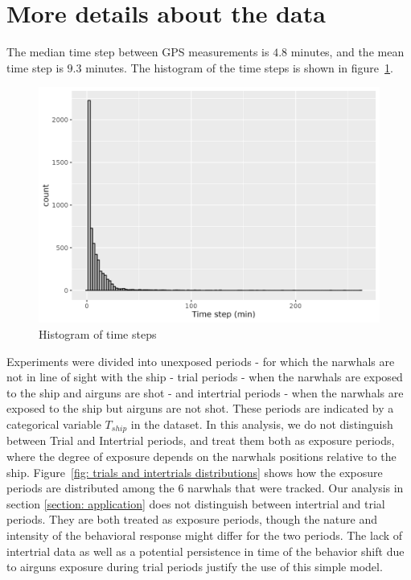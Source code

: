 \documentclass[11pt]{article}
\newcommand {\1}{\mathbb{1}}
\theoremstyle{definition}
\theoremstyle{remark}
\theoremstyle{remark}
\begin{document}
\printbibliography

\newpage 

\appendix

\section{More details about the data}

The median time step between GPS measurements is $4.8$ minutes, and the mean time step is $9.3$ minutes. The histogram of the time steps is shown in figure~\ref{fig:alltimestepshisto}.

\begin{figure}[H]
	\centering
	\includegraphics[scale=0.4]{images/data_exploration/all_time_steps_histo}
	\caption{Histogram of time steps}
	\label{fig:alltimestepshisto}
\end{figure}



Experiments were divided into unexposed periods - for which the narwhals are not in line of sight with the ship - trial periods - when the narwhals are exposed to the ship and airguns are shot - and intertrial periods - when the narwhals are exposed to the ship but airguns are not shot. These periods are indicated by a categorical variable $T_{ship}$ in the dataset. In this analysis, we do not distinguish between Trial and Intertrial periods, and treat them both as exposure periods, where the degree of exposure depends on the narwhals positions relative to the ship. Figure~\ref{fig: trials and intertrials distributions} shows how the exposure periods are distributed among the $6$ narwhals that were tracked. Our analysis in section \ref{section: application} does not distinguish between intertrial and trial periods. They are both treated as exposure periods, though the nature and intensity of the behavioral response might differ for the two periods. The lack of intertrial data as well as a potential persistence in time of the behavior shift due to airguns exposure during trial periods justify the use of this simple model.
\end{document}
